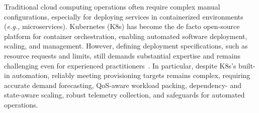 \documentclass[sigconf]{acmart}
\begin{document}
Traditional cloud computing operations often require complex manual configurations, especially for deploying services in containerized environments (\textit{e.g.,} microservices). Kubernetes (K8s) has become the de facto open-source platform for container orchestration, enabling automated software deployment, scaling, and management. However, defining deployment specifications, such as resource requests and limits, still demands substantial expertise and remains challenging even for experienced practitioners~\cite{yu2020microscaler, al2024containerized, sacco2025intent}.
In particular, despite K8s's built-in automation, reliably meeting provisioning targets remains complex, requiring accurate demand forecasting, QoS-aware workload packing, dependency- and state-aware scaling, robust telemetry collection, and safeguards for automated operations.
%
\end{document}

